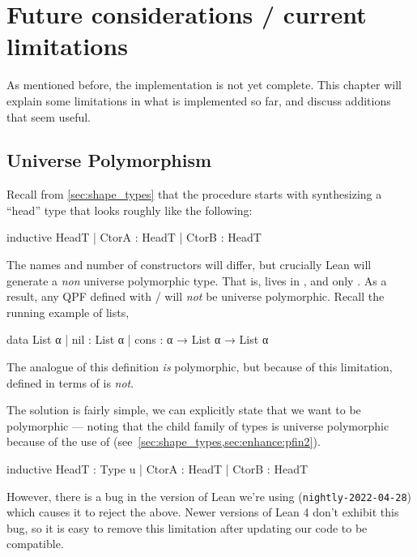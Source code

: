 
\chapter{Future considerations / current limitations}
\label{ch:limitations}


As mentioned before, the implementation is not yet complete.
This chapter will explain some limitations in what is implemented so far, and discuss
additions that seem useful.

\section{Universe Polymorphism}

Recall from \ref{sec:shape_types} that the procedure starts with synthesizing a ``head'' type that
looks roughly like the following:
\begin{leancode}
  inductive HeadT
    | CtorA : HeadT
    | CtorB : HeadT
\end{leancode}
The names and number of constructors will differ, but crucially Lean will generate a \emph{non} universe 
polymorphic type. That is,  lives in , and only .
As a result, any QPF defined with \data{}/\codata{} will \emph{not} be universe polymorphic.
Recall the running example of lists,
\begin{leancode}
  data List α 
    | nil  : List α
    | cons : α → List α → List α
\end{leancode}

The \inductive{} analogue of this definition \emph{is} polymorphic, but because of this limitation,
 defined in terms of \data{} is \emph{not}.
  

The solution is fairly simple, we can explicitly state that we want  to be polymorphic
--- noting that the child family of types is universe polymorphic because of the use of  (see~\cref{sec:shape_types,sec:enhance:pfin2}).
\begin{badleancode}

  inductive HeadT : Type u
    | CtorA : HeadT
    | CtorB : HeadT

\end{badleancode}

However, there is a bug in the version of Lean we're using (\texttt{nightly-2022-04-28}) 
which causes it to reject the above. 
Newer versions of Lean 4 don't exhibit this bug, so it is easy to remove this limitation after updating
our code to be compatible.



